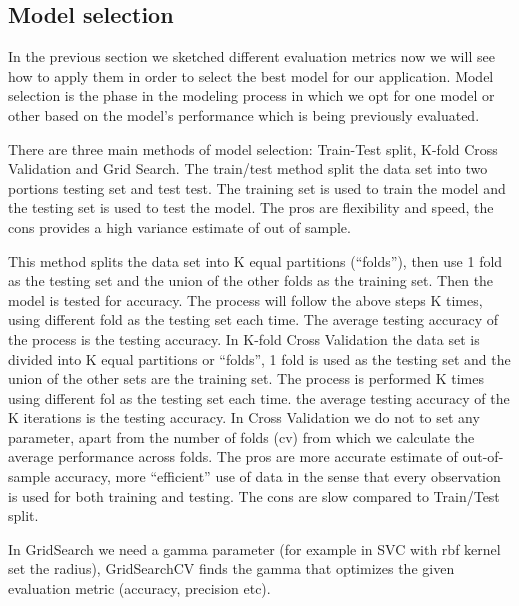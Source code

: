 \documentclass[12pt]{report}
\begin{document}
\subsection{Model selection}
In the previous section we sketched different evaluation metrics now we will see how to apply them in order to select the best model for our application. 
Model selection is the phase in the modeling process in which we opt for one model or other based on the model's performance which is being previously evaluated.

There are three main methods of model selection: Train-Test split, K-fold Cross Validation and Grid Search.
The train/test method split the data set into two portions testing set and test test. The training set is used to train the model and the testing set is used to test the model. The pros are flexibility and speed, the cons provides a high  variance estimate of out of sample. 

This method splits the data set into K equal partitions (“folds”), then use 1 fold as the testing set and the union of the other folds as the training set. Then the model is tested for accuracy. The process will follow the above steps K times, using different fold as the testing set each time. The average testing accuracy of the process is the testing accuracy.
In K-fold Cross Validation the data set is divided into K equal partitions or “folds”, 1 fold is used as the testing set and the union of the other sets are the training set. The process is performed K times using different fol as the testing set each time. the average testing accuracy of the K iterations is the testing accuracy.
In Cross Validation we do not to set any parameter, apart from the number of folds (cv) from which we calculate the average performance across folds. The pros are more accurate estimate of out-of-sample accuracy, more “efficient” use of data in the sense that every observation is used for both training and testing. The cons are slow compared to Train/Test split.

In GridSearch we need a gamma parameter (for example in SVC with rbf kernel set the radius), GridSearchCV finds the gamma that optimizes the given evaluation metric (accuracy, precision etc).
\end{document}
